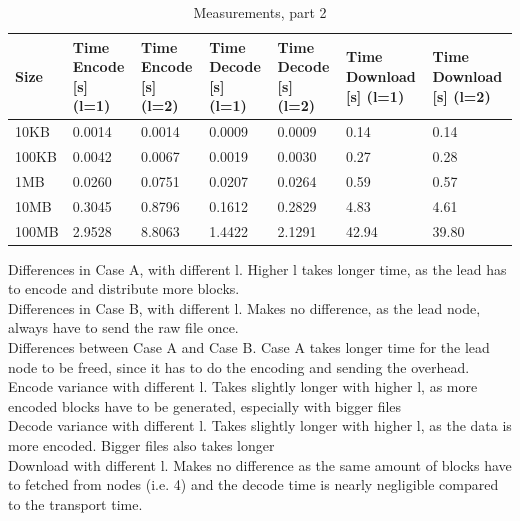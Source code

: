 \begin{table}[H]
    \begin{tabularx}{\textwidth}{|X|X|X|X|X|X|X|}
        \hline
        \cellcolor{lightgray}\textbf{Size} & \cellcolor{lightgray}\textbf{Time Encode [s] (l=1)} & \cellcolor{lightgray}\textbf{Time Encode [s] (l=2)} & \cellcolor{lightgray}\textbf{Time Decode [s] (l=1)} & \cellcolor{lightgray}\textbf{Time Decode [s] (l=2)} & \cellcolor{lightgray}\textbf{Time Download [s] (l=1)} & \cellcolor{lightgray}\textbf{Time Download [s] (l=2)} \\\hline
        10KB  & 0.0014 & 0.0014 & 0.0009 & 0.0009 & 0.14  & 0.14  \\\hline
        100KB & 0.0042 & 0.0067 & 0.0019 & 0.0030 & 0.27  & 0.28  \\\hline
        1MB   & 0.0260 & 0.0751 & 0.0207 & 0.0264 & 0.59  & 0.57  \\\hline
        10MB  & 0.3045 & 0.8796 & 0.1612 & 0.2829 & 4.83  & 4.61  \\\hline
        100MB & 2.9528 & 8.8063 & 1.4422 & 2.1291 & 42.94 & 39.80 \\\hline
    \end{tabularx}
    \caption{Measurements, part 2}
	\label{tab:e3meas2}
\end{table}

Differences in Case A, with different l. Higher l takes longer time, as the lead has to encode and distribute more blocks. \\
Differences in Case B, with different l. Makes no difference, as the lead node, always have to send the raw file once. \\
Differences between Case A and Case B. Case A takes longer time for the lead node to be freed, since it has to do the encoding and sending the overhead.
Encode variance with different l. Takes slightly longer with higher l, as more encoded blocks have to be generated, especially with bigger files\\
Decode variance with different l. Takes slightly longer with higher l, as the data is more encoded. Bigger files also takes longer \\
Download with different l. Makes no difference as the same amount of blocks have to fetched from nodes (i.e. 4) and the decode time is nearly negligible compared to the transport time.